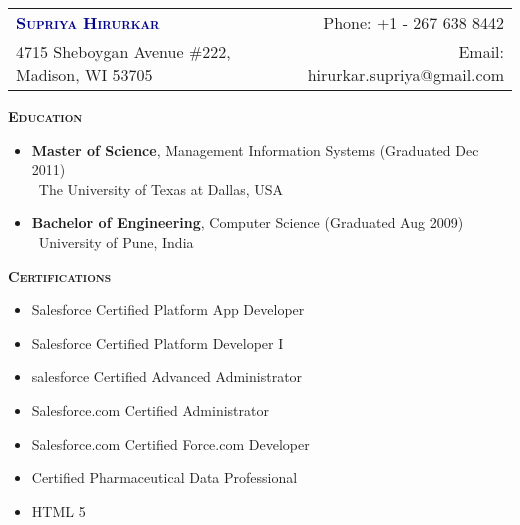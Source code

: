 \documentclass[11pt]{article}
\begin{document}
\begin{flushleft}
\begin{tabular*}{\textwidth}{@{\extracolsep{\fill}}lr}%
{\LARGE{\textcolor{darkblue}{\textbf{\textsc{Supriya Hirurkar}}}}} & Phone: +1 - 267 638 8442\\
4715 Sheboygan Avenue \#222, Madison, WI 53705 & Email: hirurkar.supriya@gmail.com
\end{tabular*}
\end{flushleft}
\begin{mdframed}[backgroundcolor=light-gray, linecolor=light-gray, roundcorner=10pt, shadow=false, shadowsize=1pt]
\Large{\textbf{\textsc{Education}}}
\end{mdframed}
\begin{itemize}\addtolength{\itemsep}{-0.5\baselineskip}%
\item{\textbf{Master of Science}, Management Information Systems \hfill (Graduated Dec 2011) }\\
	\textendash\ The University of Texas at Dallas, USA
\item{\textbf{Bachelor of Engineering}, Computer Science \hfill (Graduated Aug 2009) }\\
	\textendash\ University of Pune, India
\end{itemize}
\begin{mdframed}[backgroundcolor=light-gray, linecolor=light-gray, roundcorner=10pt, shadow=false, shadowsize=1pt]
\Large{\textbf{\textsc{Certifications}}}
\end{mdframed}
\begin{itemize}\addtolength{\itemsep}{-0.5\baselineskip}
	\item{Salesforce Certified Platform App Developer}
	\item{Salesforce Certified Platform Developer I}
	\item{salesforce Certified Advanced Administrator}	
	\item{Salesforce.com Certified Administrator}
	\item{Salesforce.com Certified Force.com Developer}
	\item{Certified Pharmaceutical Data Professional}
	\item{HTML 5}	
\end{itemize}
\end{document}
